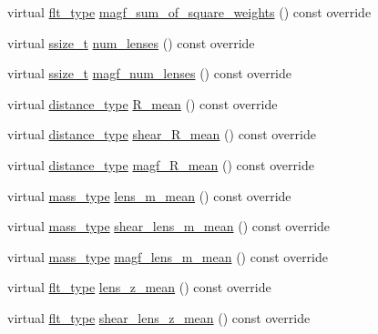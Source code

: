 \begin{DoxyCompactItemize}
\item 
virtual \hyperlink{lib_2IceBRG__main_2common_8h_ad0f130a56eeb944d9ef2692ee881ecc4}{flt\-\_\-type} \hyperlink{classIceBRG_1_1pair__bin_a75c4c2e84da0dcba8cf61ab385b707d7}{magf\-\_\-sum\-\_\-of\-\_\-square\-\_\-weights} () const override
\item 
virtual \hyperlink{lib_2IceBRG__main_2common_8h_ab322a3e50421dc5f0c43316b1b373592}{ssize\-\_\-t} \hyperlink{classIceBRG_1_1pair__bin_a01423504509d85c42ea44fd57d8a7f5c}{num\-\_\-lenses} () const override
\item 
virtual \hyperlink{lib_2IceBRG__main_2common_8h_ab322a3e50421dc5f0c43316b1b373592}{ssize\-\_\-t} \hyperlink{classIceBRG_1_1pair__bin_a0b8e51e2d55e7cd29614200a15499c84}{magf\-\_\-num\-\_\-lenses} () const override
\item 
virtual \hyperlink{namespaceIceBRG_a45499647eb87e24c10ab32c628711cec}{distance\-\_\-type} \hyperlink{classIceBRG_1_1pair__bin_a152c37388d0e8f71913876163c63b00e}{R\-\_\-mean} () const override
\item 
virtual \hyperlink{namespaceIceBRG_a45499647eb87e24c10ab32c628711cec}{distance\-\_\-type} \hyperlink{classIceBRG_1_1pair__bin_a25dc02b15e390360b5e13247b64c6807}{shear\-\_\-\-R\-\_\-mean} () const override
\item 
virtual \hyperlink{namespaceIceBRG_a45499647eb87e24c10ab32c628711cec}{distance\-\_\-type} \hyperlink{classIceBRG_1_1pair__bin_a103154353b144fd1a12f4fa39a2e5a2f}{magf\-\_\-\-R\-\_\-mean} () const override
\item 
virtual \hyperlink{namespaceIceBRG_a1be72ac4918a9b029f2eefa084213e35}{mass\-\_\-type} \hyperlink{classIceBRG_1_1pair__bin_a8d58f06df8b758e40706c4c14d76dda6}{lens\-\_\-m\-\_\-mean} () const override
\item 
virtual \hyperlink{namespaceIceBRG_a1be72ac4918a9b029f2eefa084213e35}{mass\-\_\-type} \hyperlink{classIceBRG_1_1pair__bin_a9bd588d9276bc4fd9095afac84708e36}{shear\-\_\-lens\-\_\-m\-\_\-mean} () const override
\item 
virtual \hyperlink{namespaceIceBRG_a1be72ac4918a9b029f2eefa084213e35}{mass\-\_\-type} \hyperlink{classIceBRG_1_1pair__bin_a48fb57c34a1e3ae0e62908f37214db65}{magf\-\_\-lens\-\_\-m\-\_\-mean} () const override
\item 
virtual \hyperlink{lib_2IceBRG__main_2common_8h_ad0f130a56eeb944d9ef2692ee881ecc4}{flt\-\_\-type} \hyperlink{classIceBRG_1_1pair__bin_aad3491ebd1974d3e86a3f50b09719a2c}{lens\-\_\-z\-\_\-mean} () const override
\item 
virtual \hyperlink{lib_2IceBRG__main_2common_8h_ad0f130a56eeb944d9ef2692ee881ecc4}{flt\-\_\-type} \hyperlink{classIceBRG_1_1pair__bin_a64cf13aade51455237e85d97501a869f}{shear\-\_\-lens\-\_\-z\-\_\-mean} () const override

\end{DoxyCompactItemize}
